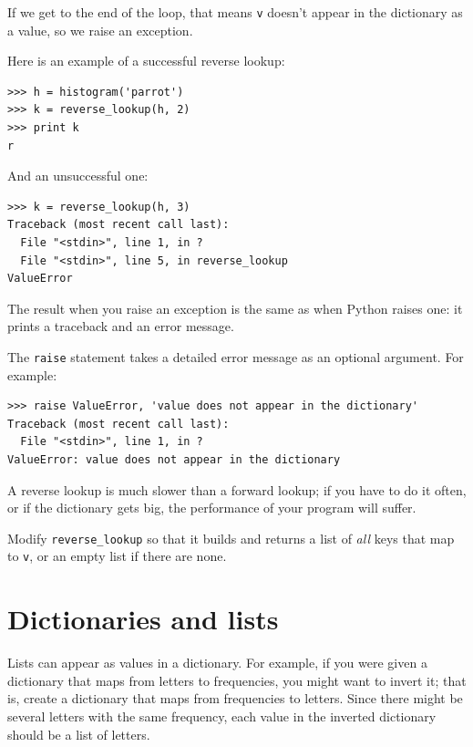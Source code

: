 \documentclass[10pt]{book}
\begin{document}
If we get to the end of the loop, that means {\tt v}
doesn't appear in the dictionary as a value, so we raise an
exception.

Here is an example of a successful reverse lookup:

\beforeverb
\begin{verbatim}
>>> h = histogram('parrot')
>>> k = reverse_lookup(h, 2)
>>> print k
r
\end{verbatim}
\afterverb
%
And an unsuccessful one:

\beforeverb
\begin{verbatim}
>>> k = reverse_lookup(h, 3)
Traceback (most recent call last):
  File "<stdin>", line 1, in ?
  File "<stdin>", line 5, in reverse_lookup
ValueError
\end{verbatim}
\afterverb
%
The result when you raise an exception is the same as when
Python raises one: it prints a traceback and an error message.


The {\tt raise} statement takes a detailed error message as an
optional argument.  For example:

\beforeverb
\begin{verbatim}
>>> raise ValueError, 'value does not appear in the dictionary'
Traceback (most recent call last):
  File "<stdin>", line 1, in ?
ValueError: value does not appear in the dictionary
\end{verbatim}
\afterverb
%
A reverse lookup is much slower than a forward lookup; if you
have to do it often, or if the dictionary gets big, the performance
of your program will suffer.

\begin{ex}
Modify \verb"reverse_lookup" so that it builds and returns a list
of {\em all} keys that map to {\tt v}, or an empty list if there
are none.
\end{ex}


\section{Dictionaries and lists}

Lists can appear as values in a dictionary.  For example, if you
were given a dictionary that maps from letters to frequencies, you
might want to invert it; that is, create a dictionary that maps
from frequencies to letters.  Since there might be several letters
with the same frequency, each value in the inverted dictionary
should be a list of letters.
\end{document}
